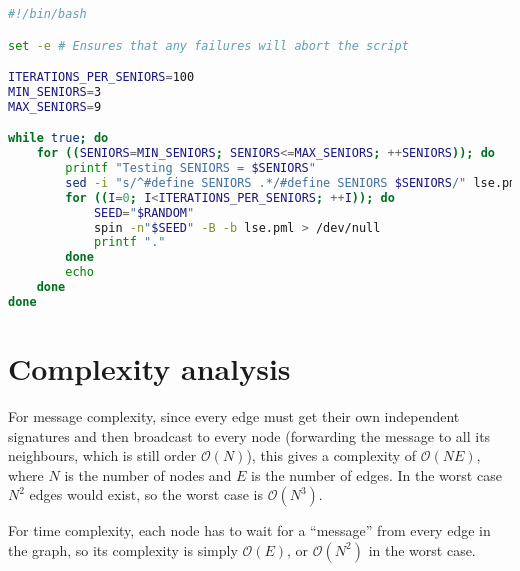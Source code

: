 \documentclass[a4paper]{scrartcl}
\begin{document}
\begin{lstlisting}[float, language = sh, caption = {Fuzzer for checking \(\texttt{SENIORS} > 2\)}, label = lst:fuzzer]
#!/bin/bash

set -e # Ensures that any failures will abort the script

ITERATIONS_PER_SENIORS=100
MIN_SENIORS=3
MAX_SENIORS=9

while true; do
    for ((SENIORS=MIN_SENIORS; SENIORS<=MAX_SENIORS; ++SENIORS)); do
        printf "Testing SENIORS = $SENIORS"
        sed -i "s/^#define SENIORS .*/#define SENIORS $SENIORS/" lse.pml
        for ((I=0; I<ITERATIONS_PER_SENIORS; ++I)); do
            SEED="$RANDOM"
            spin -n"$SEED" -B -b lse.pml > /dev/null
            printf "."
        done
        echo
    done
done
\end{lstlisting}

\section{Complexity analysis}
For message complexity, since every edge must get their own independent signatures  and then broadcast to every node (forwarding the message to all its neighbours, which is still order \(\mathcal{O}(N)\)), this gives a complexity of \(\mathcal{O}(N E)\), where \(N\) is the number of nodes and \(E\) is the number of edges. In the worst case \(N^2\) edges would exist, so the worst case is \(\mathcal{O}(N^3)\).

For time complexity, each node has to wait for a ``message'' from every edge in the graph, so its complexity is simply \(\mathcal{O}(E)\), or \(\mathcal{O}(N^2)\) in the worst case.
\end{document}
